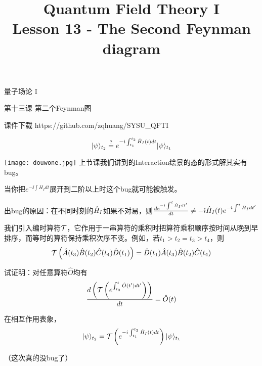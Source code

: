 \documentclass[CJK]{beamer}
\title{Quantum Field Theory I \\ Lesson 13 - The Second Feynman diagram}
\author{}
\date{}
\begin{document}
\begin{frame}
 
\begin{center}
\begin{Large}
\bch
量子场论 I 

{\vskip 0.3in}

第十三课 第二个Feynman图

\ech
\end{Large}
\end{center}

\vskip 0.2in

\bch
课件下载
\ech
https://github.com/zqhuang/SYSU\_QFTI

\end{frame}

\begin{frame}
\bch

$$|\psi\rangle_{t_2} \stackrel{?}{=} e^{-{\dot{\imath}}\int_{t_1}^{t_2} {\hat{H}}_I(t) dt} |\psi\rangle_{t_1}$$

\texttt{[image: douwone.jpg]}
\emini
{}
上节课我们讲到的Interaction绘景的态的形式解其实有bug。

当你把$e^{-\ii\int H_Idt}$展开到二阶以上时这个bug就可能被触发。

\emini


\skipline
{\small
出bug的原因：在不同时刻的${\hat{H}}_I$如果不对易，则$\frac{d e^{-{\dot{\imath}}\int^t {\hat{H}}_I dt'}}{dt} \ne -{\dot{\imath}} {\hat{H}}_I(t) e^{-{\dot{\imath}}\int^t {\hat{H}}_I dt'}$
}
\skipline
\ech
\end{frame}

\begin{frame}
\bch
我们引入编时算符${\mathcal{T}}$，它作用于一串算符的乘积时把算符乘积顺序按时间从晚到早排序，而等时的算符保持乘积次序不变。例如，若$t_1>t_2 = t_3>t_4$，则
$$\mathcal{T}\left(\hat{A}(t_3)\hat{B}(t_2)\hat{C}(t_4)\hat{D}(t_1)\right) = \hat{D}(t_1)\hat{A}(t_3)\hat{B}(t_2)\hat{C}(t_4)$$

\skipline
试证明：对任意算符$\hat{O}$均有
$$\frac{d \left(\mathcal{T}\left(e^{\int^t_{t_0} \hat{O}(t')dt'}\right)\right)}{dt} = \hat{O}(t)$$

\ech
\end{frame}

\begin{frame}
\bch
在相互作用表象，
$$|\psi\rangle_{t_2} = \mathcal{T}\left( e^{-{\dot{\imath}}\int_{t_1}^{t_2} {\hat{H}}_I(t) dt} \right)|\psi\rangle_{t_1}$$

（这次真的没bug了）
\ech
\end{frame}
\end{document}
